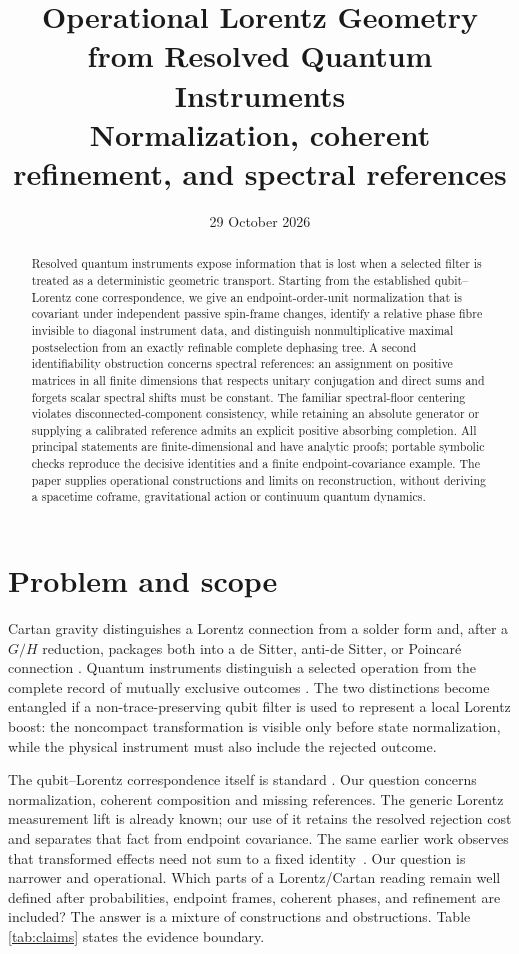 \documentclass[11pt]{article}
\title{Operational Lorentz Geometry from Resolved Quantum Instruments\\[0.4em]\large Normalization, coherent refinement, and spectral references}
\author{}
\date{29 October 2026}
\theoremstyle{remark}
\begin{document}
\maketitle

\begin{abstract}
Resolved quantum instruments expose information that is lost when a selected
filter is treated as a deterministic geometric transport.
Starting from the established qubit--Lorentz cone correspondence, we give an
endpoint-order-unit normalization that is covariant under independent passive
spin-frame changes, identify a relative phase fibre invisible to diagonal
instrument data, and distinguish nonmultiplicative maximal postselection from
an exactly refinable complete dephasing tree.
A second identifiability obstruction concerns spectral references: an
assignment on positive matrices in all finite dimensions that respects unitary
conjugation and direct sums and forgets scalar spectral shifts must be
constant.
The familiar spectral-floor centering violates disconnected-component
consistency, while retaining an absolute generator or supplying a calibrated
reference admits an explicit positive absorbing completion.
All principal statements are finite-dimensional and have analytic proofs;
portable symbolic checks reproduce the decisive identities and a finite
endpoint-covariance example.
The paper supplies operational constructions and limits on reconstruction,
without deriving a spacetime coframe, gravitational action or continuum
quantum dynamics.
\end{abstract}

\section{Problem and scope}

Cartan gravity distinguishes a Lorentz connection from a solder form and, after a
$G/H$ reduction, packages both into a de Sitter, anti-de Sitter, or Poincar\'e connection
\cite{MacDowellMansouri,StelleWest,Wise}.  Quantum instruments distinguish a selected
operation from the complete record of mutually exclusive outcomes
\cite{DaviesLewis,ChiribellaNetworks}.  The two distinctions become entangled if a
non-trace-preserving qubit filter is used to represent a local Lorentz boost: the
noncompact transformation is visible only before state normalization, while the physical
instrument must also include the rejected outcome.

The qubit--Lorentz correspondence itself is standard
\cite{ArrighiPatricotCone,ArrighiPatricotLorentz,VerstraeteLorentz,FullwoodLorentz}.
Our question concerns normalization, coherent composition and missing references.
The generic Lorentz measurement lift is already known; our use of it retains the
resolved rejection cost and separates that fact from endpoint covariance.
The same earlier work observes that transformed effects need not sum to a fixed
identity~\cite{ArrighiPatricotLorentz}.
Our question is narrower and operational.  Which parts of a Lorentz/Cartan reading remain
well defined after probabilities, endpoint frames, coherent phases, and refinement are
included?  The answer is a mixture of constructions and obstructions.  Table
\ref{tab:claims} states the evidence boundary.
\end{document}
